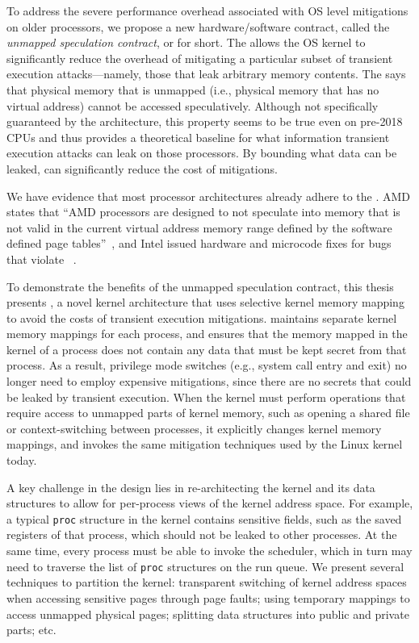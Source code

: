 
To address the severe performance overhead associated with OS level mitigations on older processors, we propose a new hardware/software contract, called the \emph{unmapped speculation contract}, or \contract{} for short.
The \contract{} allows the OS kernel
to significantly reduce the overhead of mitigating a particular subset
of transient execution attacks---namely, those that leak arbitrary
memory contents.  
The \contract{} says that physical memory that is unmapped (i.e., physical memory that has no virtual address) cannot be accessed speculatively. 
Although not specifically guaranteed by the architecture, this property seems to be true even on pre-2018 CPUs and thus provides a theoretical baseline for what information transient execution attacks can leak on those processors.
By bounding what data can be leaked, \contract can significantly reduce the cost of mitigations.

We have evidence that most processor architectures already adhere to the \contract. AMD
states that ``AMD processors are designed to not speculate into memory
that is not valid in the current virtual address memory range defined
by the software defined page tables''~\cite[pg. 2]{amd:speculation},
and Intel issued hardware and microcode fixes for bugs that violate
\contract~\cite{intel:meltdown, intel:l1tf}.

To demonstrate the benefits of the unmapped speculation contract,
this thesis presents \sys{}, a novel kernel architecture that uses
selective kernel memory mapping to avoid the costs of transient execution
mitigations.  \sys{} maintains separate kernel memory mappings for each
process, and ensures that the memory mapped in the kernel of a process
does not contain any data that must be kept secret from that process.
As a result, privilege mode switches (e.g., system call entry and exit)
no longer need to employ expensive mitigations, since there are no
secrets that could be leaked by transient execution.  When the \sys{}
kernel must perform operations that require access to unmapped parts
of kernel memory, such as opening a shared file or context-switching
between processes, it explicitly changes kernel memory mappings, and
invokes the same mitigation techniques used by the Linux kernel today.

A key challenge in the \sys design lies in re-architecting the kernel
and its data structures to allow for per-process views of the
kernel address space.  For example, a typical \texttt{proc} structure in
the kernel contains sensitive fields, such as the saved registers of that
process, which should not be leaked to other processes.  At the same time,
every process must be able to invoke the scheduler, which in turn may
need to traverse the list of \texttt{proc} structures on the run queue.
We present several techniques to partition the kernel:
transparent switching of kernel address spaces when accessing sensitive
pages through page faults; using temporary mappings to access unmapped
physical pages; splitting data structures into public and private
parts; etc.

